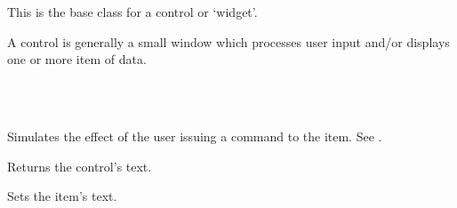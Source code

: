 \section{}\label{wxcontrol}

This is the base class for a control or `widget'.

A control is generally a small window which processes user input and/or displays one or more item
of data.


\\
\\




\label{wxcontrolcommand}


Simulates the effect of the user issuing a command to the item. See .

\label{wxcontrolgetlabel}


Returns the control's text.

\label{wxcontrolsetlabel}


Sets the item's text.

